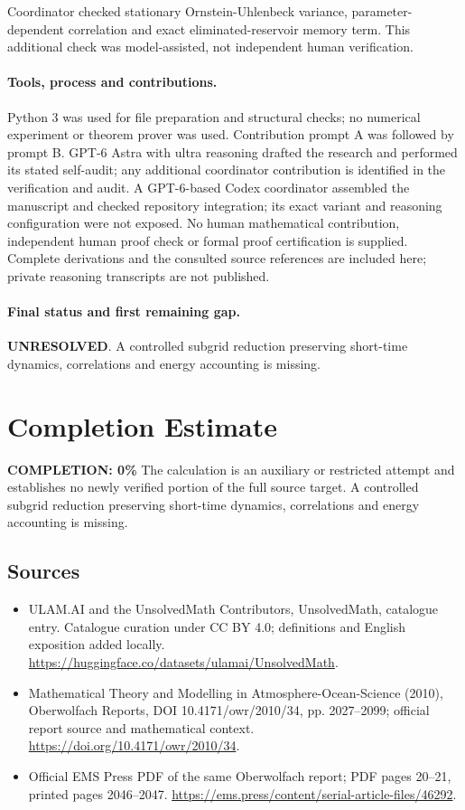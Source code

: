 \documentclass[11pt]{article}
\begin{document}
Coordinator checked stationary Ornstein-Uhlenbeck variance, parameter-dependent correlation and exact eliminated-reservoir memory term. This additional check was model-assisted, not independent human verification.

\paragraph{Tools, process and contributions.}
Python 3 was used for file preparation and structural checks; no numerical experiment or theorem prover was used. Contribution prompt A was followed by prompt B. GPT-6 Astra with ultra reasoning drafted the research and performed its stated self-audit; any additional coordinator contribution is identified in the verification and audit. A GPT-6-based Codex coordinator assembled the manuscript and checked repository integration; its exact variant and reasoning configuration were not exposed. No human mathematical contribution, independent human proof check or formal proof certification is supplied. Complete derivations and the consulted source references are included here; private reasoning transcripts are not published.

\paragraph{Final status and first remaining gap.}
\textbf{UNRESOLVED}. A controlled subgrid reduction preserving short-time dynamics, correlations and energy accounting is missing.

\section{Completion Estimate}
\noindent\textbf{COMPLETION: 0\%}
The calculation is an auxiliary or restricted attempt and establishes no newly verified portion of the full source target. A controlled subgrid reduction preserving short-time dynamics, correlations and energy accounting is missing.

\subsection{Sources}
\begin{itemize}
\item[\hypertarget{source:statement:1}{S1}] ULAM.AI and the UnsolvedMath Contributors, UnsolvedMath, catalogue entry. Catalogue curation under CC BY 4.0; definitions and English exposition added locally.
\url{https://huggingface.co/datasets/ulamai/UnsolvedMath}.
\item[\hypertarget{source:statement:2}{S2}] Mathematical Theory and Modelling in Atmosphere-Ocean-Science (2010), Oberwolfach Reports, DOI 10.4171/owr/2010/34, pp. 2027--2099; official report source and mathematical context.
\url{https://doi.org/10.4171/owr/2010/34}.
\item[\hypertarget{source:statement:3}{S3}] Official EMS Press PDF of the same Oberwolfach report; PDF pages 20--21, printed pages 2046--2047.
\url{https://ems.press/content/serial-article-files/46292}.
\end{itemize}
\label{end:statement}
\end{document}
